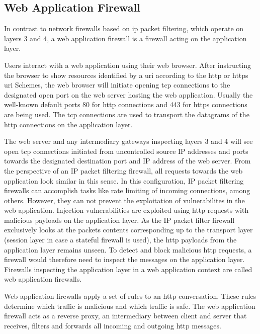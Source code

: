 \subsection{Web Application Firewall}
\label{sec:waf}
In contrast to network firewalls based on \acrfull{ip} packet filtering, which operate on layers 3 and 4, a web application firewall is a firewall acting on the application layer.

Users interact with a web application using their web browser.
After instructing the browser to show resources identified by a \acrfull{uri} according to the http or https \acrshort{uri} Schemes, the web browser will initiate opening \acrfull{tcp} connections to the designated open port on the web server hosting the web application.
Usually the well-known default ports 80 for \acrfull{http} connections and 443 for \acrfull{https} connections are being used.
The \acrshort{tcp} connections are used to transport the datagrams of the \acrshort{http} connections on the application layer. \cite{rfc7230}

The web server and any intermediary gateways inspecting layers 3 and 4 will see open \acrshort{tcp} connections initiated from uncontrolled source IP addresses and ports towards the designated destination port and IP address of the web server.
From the perspective of an IP packet filtering firewall, all requests towards the web application look similar in this sense.
In this configuration, IP packet filtering firewalls can accomplish tasks like rate limiting of incoming connections, among others.
However, they can not prevent the exploitation of vulnerabilites in the web application.
Injection vulnerabilities are exploited using \acrshort{http} requests with malicious payloads on the application layer.
As the IP packet filter firewall exclusively looks at the packets contents corresponding up to the transport layer (session layer in case a stateful firewall is used), the \acrshort{http} payloads from the application layer remains unseen.
To detect and block malicious \acrshort{http} requests, a firewall would therefore need to inspect the messages on the application layer. Firewalls inspecting the application layer in a web application context are called web application firewalls.

Web application firewalls apply a set of rules to an \acrshort{http} conversation.
These rules determine which traffic is malicious and which traffic is safe.
The web application firewall acts as a reverse proxy, an intermediary between client and server that receives, filters and forwards all incoming and outgoing \acrshort{http} messages. \cite{OWASP/waf,f5/waf}

